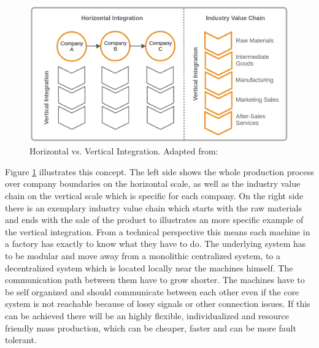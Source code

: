 \begin{figure}[H]
    \centering
    \includegraphics[width=\textwidth]{resources/images/vertical_horizontal_integration.png}
    \caption[Horizontal vs. Vertical Integration]{Horizontal vs. Vertical Integration. Adapted from: \autocite{Jur:2013}}
    \label{fig:vertical_horizontal_integration}
\end{figure}

Figure \ref{fig:vertical_horizontal_integration} illustrates this concept.
The left side shows the whole production process over company boundaries on the horizontal scale, as well as the industry value chain on the vertical scale which is specific for each company.
On the right side there is an exemplary industry value chain which starts with the raw materials and ends with the sale of the product to illustrates an more specific example of the vertical integration.
From a technical perspective this means each machine in a factory has exactly to know what they have to do.
The underlying system has to be modular and move away from a monolithic centralized system, to a decentralized system which is located locally near the machines himself.
The communication path between them have to grow shorter.
The machines have to be self organized and should communicate between each other even if the core system is not reachable because of lossy signals or other connection issues.
If this can be achieved there will be an highly flexible, individualized and resource friendly mass production, which can be cheaper, faster and can be more fault tolerant.


